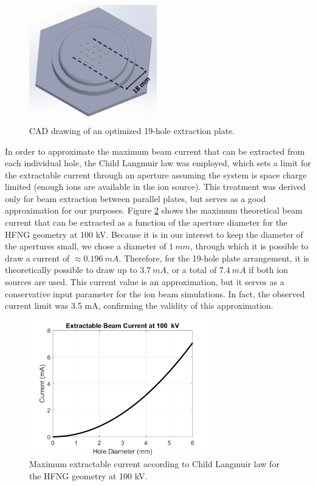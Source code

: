 \documentclass[review]{elsarticle}
\begin{document}
\begin{figure}
	\centering
	\includegraphics[width=0.5\textwidth]{pics/CAD_plate2}
	\caption{CAD drawing of an optimized 19-hole extraction plate.}
	\label{fig:CAD_extraction}
\end{figure}

In order to approximate the maximum beam current that can be extracted from each individual hole, the Child Langmuir law was employed, which sets a limit for the extractable current through an aperture assuming the system is space charge limited (enough ions are available in the ion source). This treatment was derived only for beam extraction between parallel plates, but serves as a good approximation for our purposes. Figure \ref{fig:child_lang} shows the maximum theoretical beam current that can be extracted as a function of the aperture diameter for the HFNG geometry at 100 kV. Because it is in our interest to keep the diameter of the apertures small, we chose a diameter of $1\ mm$, through which it is possible to draw a current of $\approx 0.196\ mA$. Therefore, for the 19-hole plate arrangement, it is theoretically possible to draw up to $3.7\ mA$, or a total of $7.4\ mA$ if both ion sources are used. This current value is an approximation, but it serves as a conservative input parameter for the ion beam simulations. In fact, the observed current limit was 3.5 mA, confirming the validity of this approximation.

 \begin{figure}
 	\centering
 	\includegraphics[width=0.7\textwidth]{pics/childLang}
 	\caption{Maximum extractable current according to Child Langmuir law for the HFNG geometry at 100 kV.}
 	\label{fig:child_lang}
 \end{figure} 
\end{document}
